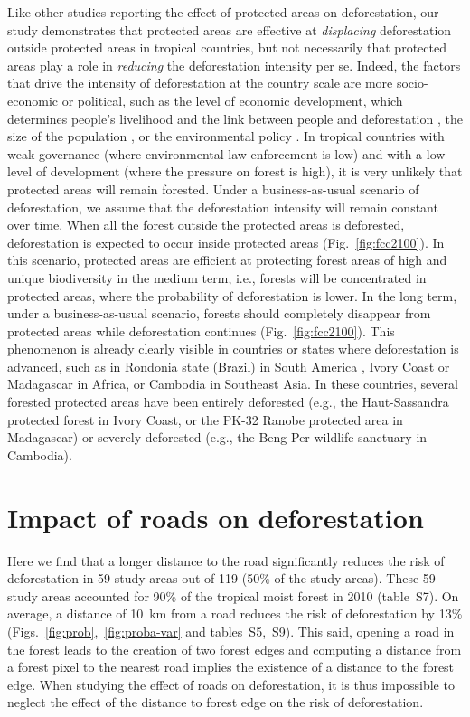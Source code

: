 \documentclass[
  12pt,
]{article}
\begin{document}
Like other studies reporting the effect of protected areas on deforestation, our study demonstrates that protected areas are effective at \emph{displacing} deforestation outside protected areas in tropical countries, but not necessarily that protected areas play a role in \emph{reducing} the deforestation intensity per se. Indeed, the factors that drive the intensity of deforestation at the country scale are more socio-economic or political, such as the level of economic development, which determines people's livelihood and the link between people and deforestation \citep{Geist2002}, the size of the population \citep{Barnes1990}, or the environmental policy \citep{Soares-Filho2014}. In tropical countries with weak governance (where environmental law enforcement is low) and with a low level of development (where the pressure on forest is high), it is very unlikely that protected areas will remain forested. Under a business-as-usual scenario of deforestation, we assume that the deforestation intensity will remain constant over time. When all the forest outside the protected areas is deforested, deforestation is expected to occur inside protected areas (Fig.~\ref{fig:fcc2100}). In this scenario, protected areas are efficient at protecting forest areas of high and unique biodiversity in the medium term, i.e., forests will be concentrated in protected areas, where the probability of deforestation is lower. In the long term, under a business-as-usual scenario, forests should completely disappear from protected areas while deforestation continues (Fig.~\ref{fig:fcc2100}). This phenomenon is already clearly visible in countries or states where deforestation is advanced, such as in Rondonia state (Brazil) in South America \citep{Ribeiro2005}, Ivory Coast \citep{Sangne2015} or Madagascar \citep{Vieilledent2020} in Africa, or Cambodia \citep{Davis2015} in Southeast Asia. In these countries, several forested protected areas have been entirely deforested (e.g., the Haut-Sassandra protected forest in Ivory Coast, or the PK-32 Ranobe protected area in Madagascar) or severely deforested (e.g., the Beng Per wildlife sanctuary in Cambodia).

\hypertarget{impact-of-roads-on-deforestation}{%
\section{Impact of roads on deforestation}\label{impact-of-roads-on-deforestation}}

Here we find that a longer distance to the road significantly reduces the risk of deforestation in 59 study areas out of 119 (50\% of the study areas). These 59 study areas accounted for 90\% of the tropical moist forest in 2010 (table~S7). On average, a distance of 10~km from a road reduces the risk of deforestation by 13\% (Figs.~\ref{fig:prob},~\ref{fig:proba-var} and tables~S5,~S9). This said, opening a road in the forest leads to the creation of two forest edges and computing a distance from a forest pixel to the nearest road implies the existence of a distance to the forest edge. When studying the effect of roads on deforestation, it is thus impossible to neglect the effect of the distance to forest edge on the risk of deforestation.\\
\end{document}
